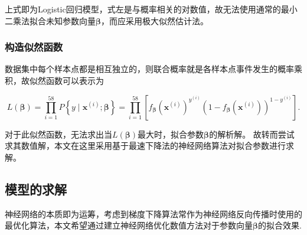 上式即为Logistic回归模型，式左是与概率相关的对数值，故无法使用通常的最小二乘法拟合未知参数向量$\boldsymbol{\beta}$，而应采用极大似然估计法。


\subsubsection{构造似然函数} %
\label{ssub:构造似然函数}

数据集中每个样本点都是相互独立的，则联合概率就是各样本点事件发生的概率乘积，故似然函数可以表示为

\begin{equation}
	L(\boldsymbol{\beta})=\prod_{i=1}^{58} P\left\{y \mid \boldsymbol{x}^{(i)} ; \boldsymbol{\beta}\right\}=\prod_{i=1}^{58}\left[f_{\boldsymbol{\beta}}\left(\boldsymbol{x}^{(i)}\right)^{y^{(i)}}\left(1-f_{\boldsymbol{\beta}}\left(\boldsymbol{x}^{(i)}\right)\right)^{1-y^{(i)}}\right].
\end{equation}

对于此似然函数，无法求出当$L(\boldsymbol{\beta})$最大时，拟合参数$\boldsymbol{\beta}$的解析解。
故转而尝试求其数值解，本文在这里采用基于最速下降法的神经网络算法对拟合参数进行求解。







\subsection{模型的求解}

神经网络的本质即为运筹，考虑到梯度下降算法常作为神经网络反向传播时使用的最优化算法，本文希望通过建立神经网络优化数值方法对于参数向量$\boldsymbol{\beta}$的拟合效果.

